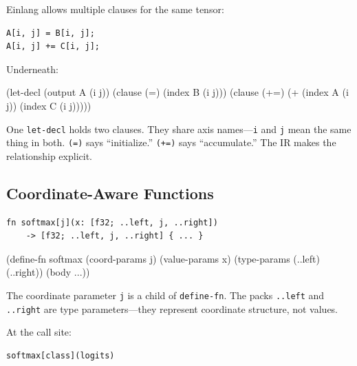 \documentclass[11pt,titlepage]{article}
\newenvironment{Shaded}{}{}
\newcommand{\NormalTok}[1]{#1}
\newcommand{\OperatorTok}[1]{\textcolor[rgb]{0.40,0.40,0.40}{#1}}
\begin{document}
Einlang allows multiple clauses for the same tensor:

\begin{verbatim}
A[i, j] = B[i, j];
A[i, j] += C[i, j];
\end{verbatim}

Underneath:

\begin{Shaded}
\begin{Highlighting}[]
\NormalTok{(let-decl (output A (i j))}
\NormalTok{  (clause (}\OperatorTok{=}\NormalTok{) (index B (i j)))}
\NormalTok{  (clause (+=) (}\OperatorTok{+}\NormalTok{ (index A (i j)) (index C (i j)))))}
\end{Highlighting}
\end{Shaded}

One \texttt{let-decl} holds two clauses. They share axis
names---\texttt{i} and \texttt{j} mean the same thing in both.
\texttt{(=)} says ``initialize.'' \texttt{(+=)} says ``accumulate.'' The
IR makes the relationship explicit.

\vspace{2em}

\hypertarget{coordinate-aware-functions}{%
\subsection{Coordinate-Aware
Functions}\label{coordinate-aware-functions}}

\begin{verbatim}
fn softmax[j](x: [f32; ..left, j, ..right])
    -> [f32; ..left, j, ..right] { ... }
\end{verbatim}

\begin{Shaded}
\begin{Highlighting}[]
\NormalTok{(define-fn softmax (coord-params j) (value-params x)}
\NormalTok{  (type-params (..left) (..right))}
\NormalTok{  (body ...))}
\end{Highlighting}
\end{Shaded}

The coordinate parameter \texttt{j} is a child of \texttt{define-fn}.
The packs \texttt{..left} and \texttt{..right} are type
parameters---they represent coordinate structure, not values.

At the call site:

\begin{verbatim}
softmax[class](logits)
\end{verbatim}
\end{document}
